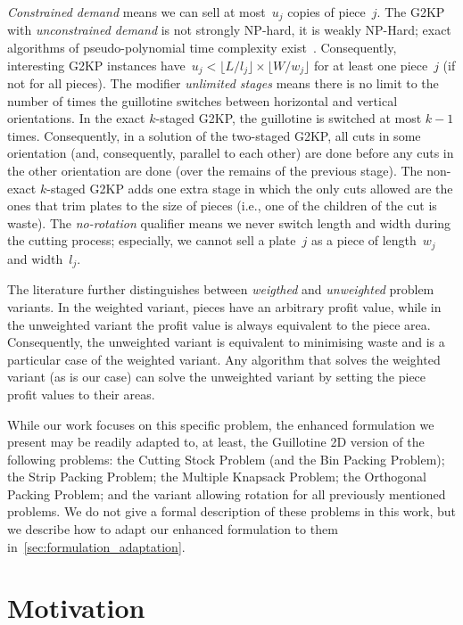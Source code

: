 \documentclass[ppgc,prop-tese,english,formais,babel]{iiufrgs}
\begin{document}
\emph{Constrained demand} means we can sell at most~\(u_j\) copies of piece~\(j\).
The G2KP with \emph{unconstrained demand} is not strongly NP-hard, it is weakly NP-Hard; exact algorithms of pseudo-polynomial time complexity exist~\citep{beasley:1985:guillotine}.
Consequently, interesting G2KP instances have~\(u_j < \lfloor L / l_j \rfloor \times \lfloor W / w_j \rfloor \) for at least one piece~\(j\) (if not for all pieces).
The modifier \emph{unlimited stages} means there is no limit to the number of times the guillotine switches between horizontal and vertical orientations.
In the exact \(k\)-staged G2KP, the guillotine is switched at most \(k-1\) times.
Consequently, in a solution of the two-staged G2KP, all cuts in some orientation (and, consequently, parallel to each other) are done before any cuts in the other orientation are done (over the remains of the previous stage).
The non-exact \(k\)-staged G2KP adds one extra stage in which the only cuts allowed are the ones that trim plates to the size of pieces (i.e., one of the children of the cut is waste).
The \emph{no-rotation} qualifier means we never switch length and width during the cutting process; especially, we cannot sell a plate~\(j\) as a piece of length~\(w_j\) and width~\(l_j\).

The literature further distinguishes between \emph{weigthed} and \emph{unweighted} problem variants.
In the weighted variant, pieces have an arbitrary profit value, while in the unweighted variant the profit value is always equivalent to the piece area.
Consequently, the unweighted variant is equivalent to minimising waste and is a particular case of the weighted variant.
Any algorithm that solves the weighted variant (as is our case) can solve the unweighted variant by setting the piece profit values to their areas.

While our work focuses on this specific problem, the enhanced formulation we present may be readily adapted to, at least, the Guillotine 2D version of the following problems: the Cutting Stock Problem (and the Bin Packing Problem); the Strip Packing Problem; the Multiple Knapsack Problem; the Orthogonal Packing Problem; and the variant allowing rotation for all previously mentioned problems.
We do not give a formal description of these problems in this work, but we describe how to adapt our enhanced formulation to them in~\cref{sec:formulation_adaptation}.

\section{Motivation}
\end{document}
